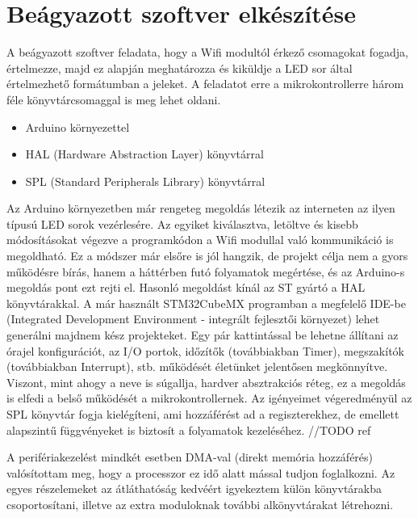 \documentclass[../main.tex]{subfiles}
\begin{document}
\section{Beágyazott szoftver elkészítése}
        A beágyazott szoftver feladata, hogy a Wifi modultól érkező csomagokat fogadja, értelmezze, majd ez alapján meghatározza és kiküldje a LED sor által értelmezhető formátumban a jeleket. A feladatot erre a mikrokontrollerre három féle könyvtárcsomaggal is meg lehet oldani. 
        
        \begin{itemize}
            \item Arduino környezettel
            \item HAL (Hardware Abstraction Layer) könyvtárral
            \item SPL (Standard Peripherals Library) könyvtárral
        \end{itemize}
        
        Az Arduino környezetben már rengeteg megoldás létezik az interneten az ilyen típusú LED sorok vezérlesére. Az egyiket kiválasztva, letöltve és kisebb módosításokat végezve a programkódon a Wifi modullal való kommunikáció is megoldható. Ez a módszer már elsőre is jól hangzik, de projekt célja nem a gyors működésre bírás, hanem a háttérben futó folyamatok megértése, és az Arduino-s megoldás pont ezt rejti el. Hasonló megoldást kínál az ST gyártó a HAL könyvtárakkal. A már használt STM32CubeMX programban a megfelelő IDE-be (Integrated Development Environment - integrált fejlesztői környezet) lehet generálni majdnem kész projekteket. Egy pár kattintással be lehetne állítani az órajel konfigurációt, az I/O portok, időzítők (továbbiakban Timer), megszakítók (továbbiakban Interrupt), stb. működését életünket jelentősen megkönnyítve. Viszont, mint ahogy a neve is súgallja, hardver absztrakciós réteg, ez a megoldás is elfedi a belső működését a mikrokontrollernek. Az igényeimet végeredményül az SPL könyvtár fogja kielégíteni, ami hozzáférést ad a regiszterekhez, de emellett alapszintű függvényeket is biztosít a folyamatok kezeléséhez. //TODO ref
        
        A perifériakezelést mindkét esetben DMA-val (direkt memória hozzáférés) valósítottam meg, hogy a processzor ez idő alatt mással tudjon foglalkozni. Az egyes részelemeket az átláthatóság kedvéért igyekeztem külön könyvtárakba csoportosítani, illetve az extra moduloknak további alkönyvtárakat létrehozni. 
        
\end{document}
